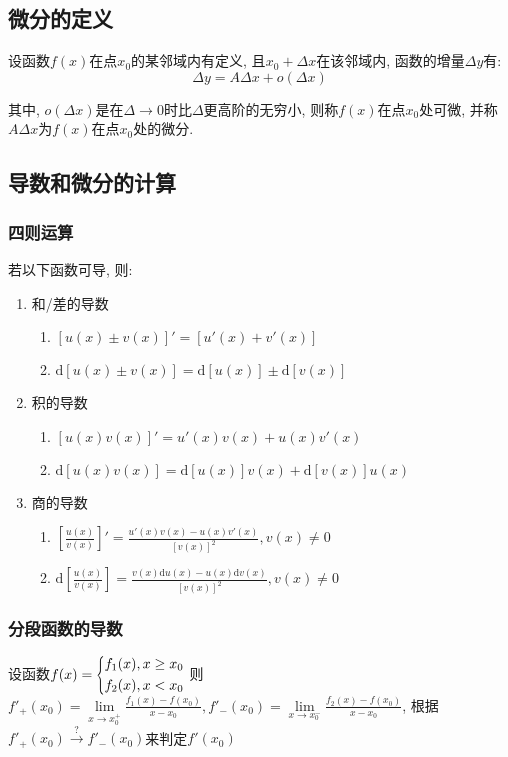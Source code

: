 \subsection{微分的定义}
设函数$ f(x) $在点$ x_{0} $的某邻域内有定义, 且$ x_{0}+\Delta x $在该邻域内, 函数的增量$ \Delta y $有:
\begin{equation*}
\Delta y=A\Delta x+o(\Delta x)
\end{equation*}\par
其中, $ o(\Delta x) $是在$ \Delta \rightarrow 0 $时比$ \Delta $更高阶的无穷小, 则称$ f(x) $在点$ x_{0} $处可微, 并称$ A\Delta x $为$ f(x) $在点$ x_{0} $处的微分.
\subsection{导数和微分的计算}\label{求导的方法}
\subsubsection{四则运算}
若以下函数可导, 则:
\begin{enumerate}
\item 和/差的导数
\begin{enumerate}
\item $ [u(x)\pm v(x)]'=[u'(x)+v'(x)] $
\item $ \mathrm{d}[u(x)\pm v(x)]=\mathrm{d}[u(x)]\pm \mathrm{d}[v(x)] $
\end{enumerate}
\item 积的导数
\begin{enumerate}
\item $ [u(x)v(x)]'=u'(x)v(x)+u(x)v'(x) $
\item $ \mathrm{d}[u(x)v(x)]=\mathrm{d}[u(x)]v(x)+\mathrm{d}[v(x)]u(x) $
\end{enumerate}
\item 商的导数
\begin{enumerate}
\item $ [\frac{u(x)}{v(x)}]'=\frac{u'(x)v(x)-u(x)v'(x)}{[v(x)]^{2}}, v(x)\neq 0 $
\item $ \mathrm{d}[\frac{u(x)}{v(x)}]=\frac{v(x)\mathrm{d}u(x)-u(x)\mathrm{d}v(x)}{[v(x)]^{2}}, v(x)\neq 0 $
\end{enumerate}
\end{enumerate}
\subsubsection{分段函数的导数}
设函数$ f(x)=\scaleleftright[6pt]{\biggl\{}{
\begin{aligned}
& f_{1}(x), x\ge x_{0} \\
& f_{2}(x), x< x_{0}
\end{aligned} }{.} $
则$ f'_{+}(x_{0})=\lim\limits_{x\rightarrow x_{0}^{+}}\frac{f_{1}(x)-f(x_{0})}{x-x_{0}}, f'_{-}(x_{0})=\lim\limits_{x\rightarrow x_{0}^{-}}\frac{f_{2}(x)-f(x_{0})}{x-x_{0}} $, 根据$ f'_{+}(x_{0})\xrightarrow{?}f'_{-}(x_{0}) $来判定$ f'(x_{0}) $

